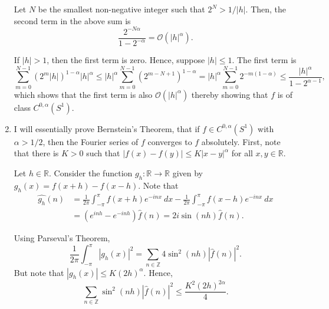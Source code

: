\documentclass[12pt]{amsart}
\newcommand{\R}{\mathbb{R}}
\newcommand{\Z}{\mathbb{Z}}
\newcommand{\wh}[1]{\widehat{#1}}
\newcommand{\calO}{\mathcal{O}}
\begin{document}
\begin{enumerate}[label=(\alph*)]
	Let $N$ be the smallest non-negative integer such that $2^N > 1/|h|$. Then, the second term in the above sum is 
	\begin{equation*}
		\frac{2^{-N\alpha}}{1 - 2^{-\alpha}} = \calO(|h|^\alpha).
	\end{equation*}

	If $|h| > 1$, then the first term is zero. Hence, suppose $|h|\le 1$. The first term is 
	\begin{equation*}
		\sum_{m = 0}^{N - 1} \left(2^m|h|\right)^{1 - \alpha}|h|^\alpha\le |h|^\alpha\sum_{m = 0}^{N - 1} \left(2^{m - N + 1}\right)^{1 - \alpha} = |h|^\alpha\sum_{m = 0}^{N - 1} 2^{-m(1 - \alpha)}\le\frac{|h|^\alpha}{1 - 2^{\alpha - 1}},
	\end{equation*}
	which shows that the first term is also $\calO(|h|^\alpha)$ thereby showing that $f$ is of class $C^{0,\alpha}(S^1)$.

	\item I will essentially prove Bernstein's Theorem, that if $f\in C^{0,\alpha}(S^1)$ with $\alpha > 1/2$, then the Fourier series of $f$ converges to $f$ absolutely.  First, note that there is $K > 0$ such that $|f(x) - f(y)|\le K|x - y|^\alpha$ for all $x,y\in\R$.

	Let $h\in\R$. Consider the function $g_h:\R\to\R$ given by $g_h(x) = f(x + h) - f(x - h)$. Note that 
	\begin{align*}
		\wh{g_h}(n) &= \frac{1}{2\pi}\int_{-\pi}^\pi f(x + h)e^{-inx}~dx - \frac{1}{2\pi}\int_{-\pi}^\pi f(x - h)e^{-inx}~dx\\
		&= (e^{inh} - e^{-inh})\wh f(n) = 2i\sin(nh)\wh f(n).
	\end{align*}

	Using Parseval's Theorem, 
	\begin{equation*}
		\frac{1}{2\pi}\int_{-\pi}^\pi |g_h(x)|^2 = \sum_{n\in\Z} 4\sin^2(nh)|\wh f(n)|^2.
	\end{equation*}
	But note that $|g_h(x)|\le K(2h)^\alpha$. Hence, 
	\begin{equation*}
		\sum_{n\in\Z}\sin^2(nh)|\wh f(n)|^2\le\frac{K^2 (2h)^{2\alpha}}{4}.
	\end{equation*}


\end{enumerate}
\end{document}
